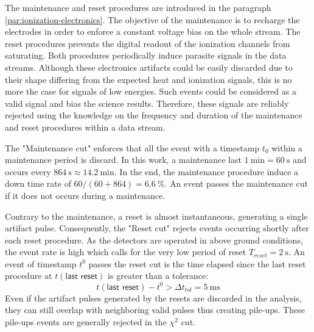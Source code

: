 

The maintenance and reset procedures are introduced in the paragraph \ref{par:ionization-electronics}.  The objective of the maintenance is to recharge the electrodes in order to enforce a constant voltage bias on the whole stream. The reset procedures prevents the digital readout of the ionization channels from saturating. Both procedures periodically induce parasite signals in the data streams. Although these electronics artifacts could be easily discarded due to their shape differing from the expected heat and ionization signals, this is no more the case for signals of low energies. Such events could be considered as a valid signal and bias the science results. Therefore, these signals are reliably rejected using the knowledge on the frequency and duration of the maintenance and reset procedures within a data stream.

The "Maintenance cut" enforces that all the event with a timestamp $t_0$ within a maintenance period is discard. In this work, a maintenance last $\SI{1}{\minute}=\SI{60}{\s}$ and occurs every $\SI{864}{\s}\approx\SI{14.2}{\minute}$. In the end, the maintenance procedure induce a down time rate of $60/(60+864)=\SI{6.6}{\percent}$. An event passes the maintenance cut if it does not occurs during a maintenance.

Contrary to the maintenance, a reset is almost instantaneous, generating a single artifact pulse. Consequently, the "Reset cut" rejects events occurring shortly after each reset procedure. As the detectors are operated in above ground conditions, the event rate is high which calls for the very low period of reset $T_{reset} = \SI{2}{\s}$. An event of timestamp $t^0$ passes the reset cut is the time elapsed since the last reset procedure at $t(\textsf{last reset})$ is greater than a tolerance:
\begin{equation}
t(\textsf{last reset}) - t^0 > \Delta t_{tol}=\SI{5}{\milli\s}
\end{equation}
Even if the artifact pulses generated by the resets are discarded in the analysis, they can still overlap with neighboring valid pulses thus creating pile-ups. These pile-ups events are generally rejected in the $\chi^2$ cut.


